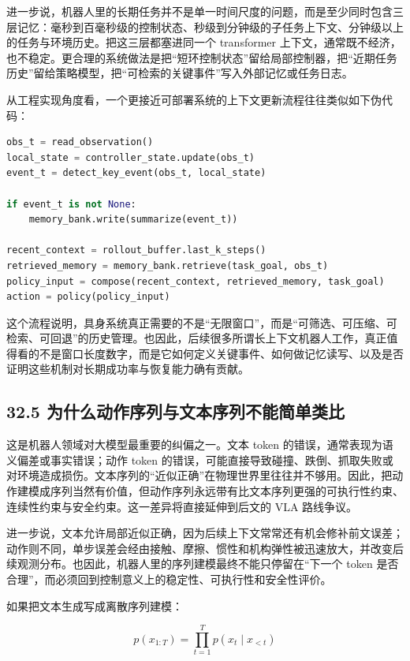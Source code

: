 进一步说，机器人里的长期任务并不是单一时间尺度的问题，而是至少同时包含三层记忆：毫秒到百毫秒级的控制状态、秒级到分钟级的子任务上下文、分钟级以上的任务与环境历史。把这三层都塞进同一个 transformer 上下文，通常既不经济，也不稳定。更合理的系统做法是把“短环控制状态”留给局部控制器，把“近期任务历史”留给策略模型，把“可检索的关键事件”写入外部记忆或任务日志。

从工程实现角度看，一个更接近可部署系统的上下文更新流程往往类似如下伪代码：

\begin{lstlisting}[language=python]
obs_t = read_observation()
local_state = controller_state.update(obs_t)
event_t = detect_key_event(obs_t, local_state)

if event_t is not None:
    memory_bank.write(summarize(event_t))

recent_context = rollout_buffer.last_k_steps()
retrieved_memory = memory_bank.retrieve(task_goal, obs_t)
policy_input = compose(recent_context, retrieved_memory, task_goal)
action = policy(policy_input)
\end{lstlisting}

这个流程说明，具身系统真正需要的不是“无限窗口”，而是“可筛选、可压缩、可检索、可回退”的历史管理。也因此，后续很多所谓长上下文机器人工作，真正值得看的不是窗口长度数字，而是它如何定义关键事件、如何做记忆读写、以及是否证明这些机制对长期成功率与恢复能力确有贡献。

\subsection*{32.5 为什么动作序列与文本序列不能简单类比}


这是机器人领域对大模型最重要的纠偏之一。文本 token 的错误，通常表现为语义偏差或事实错误；动作 token 的错误，可能直接导致碰撞、跌倒、抓取失败或对环境造成损伤。文本序列的“近似正确”在物理世界里往往并不够用。因此，把动作建模成序列当然有价值，但动作序列永远带有比文本序列更强的可执行性约束、连续性约束与安全约束。这一差异将直接延伸到后文的 VLA 路线争议。

进一步说，文本允许局部近似正确，因为后续上下文常常还有机会修补前文误差；动作则不同，单步误差会经由接触、摩擦、惯性和机构弹性被迅速放大，并改变后续观测分布。也因此，机器人里的序列建模最终不能只停留在“下一个 token 是否合理”，而必须回到控制意义上的稳定性、可执行性和安全性评价。

如果把文本生成写成离散序列建模：

\begin{equation*}
p(x_{1:T}) = \prod_{t=1}^{T} p(x_t \mid x_{<t})
\end{equation*}


